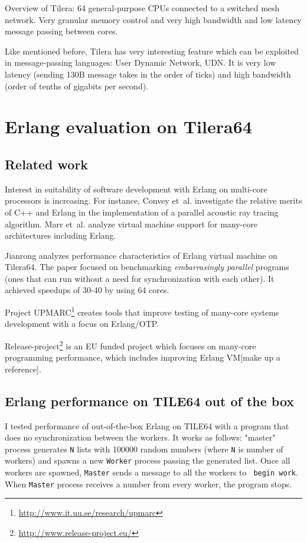 \documentclass[english,11pt]{article}
\begin{document}
Overview of Tilera: 64 general-purpose CPUs connected to a switched mesh
network. Very granular memory control and very high bandwidth and low latency
message passing between cores.

Like mentioned before, Tilera has very interesting feature which can be
exploited in message-passing languages: User Dynamic Network, UDN. It is very
low latency (sending 130B message takes in the order of ticks) and high
bandwidth (order of tenths of gigabits per second).

\section{Erlang evaluation on Tilera64}
\label{sec:erlang-eval}

\subsection{Related work}

Interest in suitability of software development with Erlang on multi-core
processors is increasing. For instance, Convey et~al.\cite{erlang-acoustic}
investigate the relative merits of C++ and Erlang in the implementation of a
parallel acoustic ray tracing algorithm. Marr et~al.\cite{vm-manycore} analyze
virtual machine support for many-core architectures including Erlang.

Jianrong \cite{erlang-manycore-scalability} analyzes performance characteristics
of Erlang virtual machine on Tilera64. The paper focused on benchmarking
\emph{embarrasingly parallel} programs (ones that can run without a need for
synchronization with each other). It achieved speedups of 30-40 by using 64
cores.

Project UPMARC\footnote{\url{http://www.it.uu.se/research/upmarc}} creates tools
that improve testing of many-core systems development with a focus on
Erlang/OTP.

Release-project\footnote{\url{http://www.release-project.eu/}} is an EU funded
project which focuses on many-core programming performance, which includes
improving Erlang VM[make up a reference].

\subsection{Erlang performance on TILE64 out of the box}

I tested performance of out-of-the-box Erlang on TILE64 with a program that does
no synchronization between the workers. It works as follows: "master" process
generates {\tt N} lists with 100000 random numbers (where {\tt N} is number of
workers) and spawns a new {\tt Worker} process passing the generated list. Once
all workers are spawned, {\tt Master} sends a message to all the workers to {\tt
begin work}. When {\tt Master} process receives a number from every worker, the
program stops.
\end{document}
